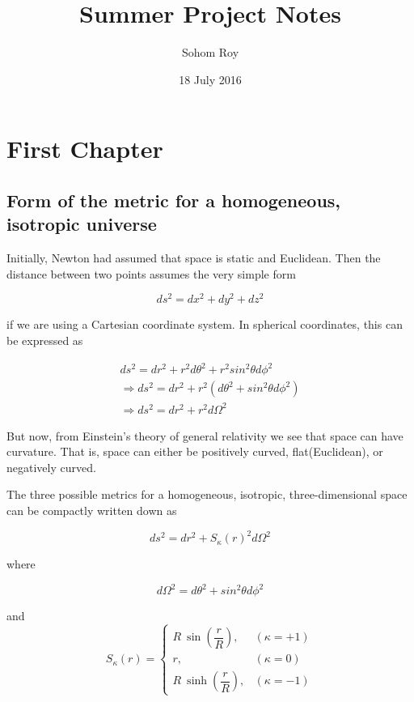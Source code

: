 \documentclass[a4,12pt,oneside]{report}
\begin{document}
	\title{Summer Project Notes}
	\date{18 July 2016}
	\author{Sohom Roy}
	\maketitle
	
	
	\tableofcontents

	
	\chapter{First Chapter}
	
	\section{Form of the metric for a homogeneous, isotropic universe}
	
	Initially, Newton had assumed that space is static and Euclidean. Then the distance between two points assumes the very simple form
	
	\begin{equation}
		ds^2=dx^2+dy^2+dz^2
	\end{equation}
	
	if we are using a Cartesian coordinate system. In spherical coordinates, this can be expressed as

	\begin{align}
	ds^2=dr^2+ r^2d\theta^2 + r^2sin^2\theta d\phi^2	\\
	\Rightarrow ds^2=dr^2+ r^2(d\theta^2+sin^2\theta d\phi^2) \\
	\Rightarrow ds^2=dr^2+ r^2d\Omega^2 
	\end{align}
	
	But now, from Einstein's theory of general relativity we see that space can have curvature. That is, space can either be positively curved, flat(Euclidean), or negatively curved.
	
	The three possible metrics for a homogeneous, isotropic, three-dimensional space can be compactly written down as
	
	\begin{equation}
	    ds^2=dr^2+S_\kappa(r)^2d\Omega^2
	\end{equation}
	
	where 
	
	\begin{equation}
		d\Omega^2=d\theta^2+sin^2\theta d\phi^2
	\end{equation}
	
	and 
	\begin{equation}
		S_\kappa(r)=\begin{cases}R\:\sin\left(\dfrac{r}{R}\right),   &(\kappa=+1) \\
		r,  &(\kappa=0) \\
		R\:\sinh\left(\dfrac{r}{R}\right),  &(\kappa=-1)
		\end{cases}
	\end{equation}
	
\end{document}
